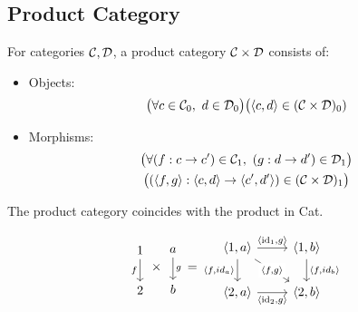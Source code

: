 \subsection{Product Category}
\begin{definition}
  For categories $\mathcal{C},\mathcal{D}$, a product category $\mathcal{C}\times \mathcal{D}$ consists of:
  \parencite{awodey:category_theory}
  \begin{itemize}
    \item Objects:
      \[\big(\forall c \in \mathcal{C}_0,\ d \in \mathcal{D}_0\big)
        \big(\langle c, d\rangle\in (\mathcal{C}\times \mathcal{D})_0)\]
    \item Morphisms:
      \[
        \begin{gathered}
          \big(\forall (f: c \to c')\in \mathcal{C}_1,\ (g:d \to d')\in \mathcal{D}_1\big)\\
          \big((\langle f,g\rangle : \langle c,d\rangle \to \langle c', d'\rangle)\in (\mathcal{C}\times \mathcal{D})_1\big)
        \end{gathered}
      \]
  \end{itemize}
\end{definition}

\begin{remark}
  The product category coincides with the product in Cat.
\end{remark}

\begin{example}
  \[
    \begin{tikzcd}[ampersand replacement=\&]
      1 \\
      2
      \arrow["f"', from=1-1, to=2-1]
    \end{tikzcd}
    \times
    \begin{tikzcd}
      a \\
      b
      \arrow["g", from=1-1, to=2-1]
    \end{tikzcd}
    =
    \begin{tikzcd}[ampersand replacement=\&]
      {\langle1,a\rangle} \& {\langle1,b\rangle} \\
      {\langle2,a\rangle} \& {\langle2,b\rangle}
      \arrow["{\langle \id_1,g\rangle}", from=1-1, to=1-2]
      \arrow["{\langle f,id_a\rangle}"', from=1-1, to=2-1]
      \arrow["{\langle \id_2,g\rangle}"', from=2-1, to=2-2]
      \arrow["{\langle f,id_b\rangle}", from=1-2, to=2-2]
      \arrow["{\langle f,g\rangle}"{description}, from=1-1, to=2-2]
    \end{tikzcd}
  \]
\end{example}
